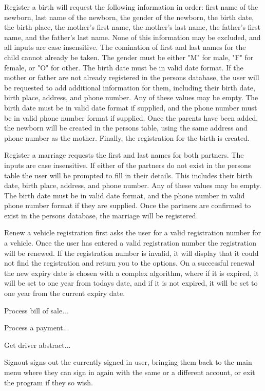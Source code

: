 Register a birth will request the following information in order: first name of
the newborn, last name of the newborn, the gender of the newborn, the birth
date, the birth place, the mother's first name, the mother's last name, the 
father's first name, and the father's last name.  None of this information may
be excluded, and all inputs are case insensitive.  The comination of first and
last names for the child cannot already be taken.  The gender must be either
"M" for male, "F" for female, or "O" for other.  The birth date must be in 
valid date format.  If the mother or father are not already registered in the 
persons database, the user will be requested to add additional information for 
them, including their birth date, birth place, address, and phone number.  Any 
of these values may be empty.  The birth date must be in valid date format if 
supplied, and the phone number must be in valid phone number format if supplied.  
Once the parents have been added, the newborn will be created in the persons
table, using the same address and phone number as the mother.  Finally, the 
registration for the birth is created.  

Register a marriage requests the first and last names for both partners.  The 
inputs are case insensitive.  If either of the partners do not exist in the
persons table the user will be prompted to fill in their details.  This includes
their birth date, birth place, address, and phone number.  Any of these values 
may be empty.  The birth date must be in valid date format, and the phone number 
in valid phone number format if they are supplied.  Once the partners are 
confirmed to exist in the persons database, the marriage will be registered.  

Renew a vehicle registration first asks the user for a valid registration
number for a vehicle. Once the user has entered a valid registration number the
registration will be renewed. If the registration number is invalid, it will
display that it could not find the registration and return you to the options.
On a successful renewal the new expiry date is chosen with a complex algorithm,
where if it is expired, it will be set to one year from todays date, and if it
is not expired, it will be set to one year from the current expiry date.

Process bill of sale...

Process a payment... 

Get driver abstract...

Signout signs out the currently signed in user, bringing them back to the main
menu where they can sign in again with the same or a different account, or exit
the program if they so wish.  


